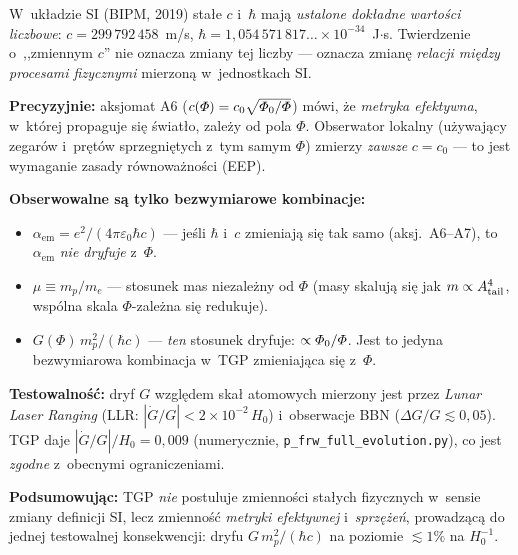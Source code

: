 \begin{remark}\label{rem:SI-constants}
W~uk\l{}adzie SI (BIPM, 2019) sta\l{}e $c$ i~$\hbar$ maj\k{a}
\emph{ustalone dok\l{}adne warto\'sci liczbowe}: $c = 299\,792\,458$~m/s,
$\hbar = 1{,}054\,571\,817\ldots \times 10^{-34}$~J$\cdot$s.
Twierdzenie o~,,zmiennym $c$'' nie oznacza zmiany tej liczby
--- oznacza zmian\k{e} \emph{relacji mi\k{e}dzy procesami fizycznymi}
mierzon\k{a} w~jednostkach SI.

\medskip\noindent
\textbf{Precyzyjnie:} aksjomat A6 ($c(\varPhi) = c_0\sqrt{\varPhi_0/\varPhi}$)
m\'owi, \.ze \emph{metryka efektywna}, w~kt\'orej propaguje si\k{e}
\'swiat\l{}o, zale\.zy od pola $\Phi$. Obserwator lokalny
(u\.zywaj\k{a}cy zegar\'ow i~pr\k{e}t\'ow sprzegni\k{e}tych
z~tym samym $\Phi$) zmierzy \emph{zawsze} $c = c_0$
--- to jest wymaganie zasady r\'ownowa\.zno\'sci (EEP).

\medskip\noindent
\textbf{Obserwowalne s\k{a} tylko bezwymiarowe kombinacje:}
\begin{itemize}[nosep]
  \item $\alpha_{\mathrm{em}} = e^2/(4\pi\varepsilon_0 \hbar c)$
    --- je\'sli $\hbar$ i~$c$ zmieniaj\k{a} si\k{e} tak samo
    (aksj.~A6--A7), to $\alpha_{\mathrm{em}}$
    \emph{nie dryfuje} z~$\Phi$.
  \item $\mu \equiv m_p/m_e$ --- stosunek mas niezale\.zny od $\Phi$
    (masy skaluj\k{a} si\k{e} jak $m \propto A_{\rm tail}^4$,
    wsp\'olna skala $\Phi$-zale\.zna si\k{e} redukuje).
  \item $G(\Phi)\,m_p^2/(\hbar c)$ --- \emph{ten} stosunek dryfuje:
    $\propto \varPhi_0/\varPhi$. Jest to jedyna bezwymiarowa kombinacja
    w~TGP zmieniaj\k{a}ca si\k{e} z~$\Phi$.
\end{itemize}

\medskip\noindent
\textbf{Testowalno\'s\'c:}
dryf $G$ wzgl\k{e}dem ska\l{} atomowych mierzony jest przez
\emph{Lunar Laser Ranging} (LLR: $|\dot G/G| < 2 \times 10^{-2}\,H_0$)
i~obserwacje BBN ($\Delta G/G \lesssim 0{,}05$).
TGP daje $|\dot G/G|/H_0 = 0{,}009$ (numerycznie,
\texttt{p\_frw\_full\_evolution.py}), co jest \emph{zgodne}
z~obecnymi ograniczeniami.

\medskip\noindent
\textbf{Podsumowuj\k{a}c:} TGP \emph{nie} postuluje zmienno\'sci
sta\l{}ych fizycznych w~sensie zmiany definicji SI,
lecz zmienno\'s\'c \emph{metryki efektywnej} i~\emph{sprz\k{e}\.ze\'n},
prowadz\k{a}c\k{a} do jednej testowalnej konsekwencji:
dryfu $G\,m_p^2/(\hbar c)$ na poziomie $\lesssim 1\%$ na $H_0^{-1}$.
\end{remark}

